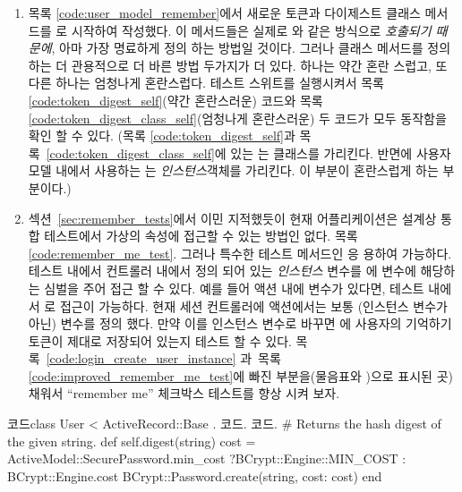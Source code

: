 {{%
  

\begin{enumerate} 

\item 목록 \ref{code:user_model_remember}에서 새로운 토큰과 다이제스트 클래스 메서드를  로 시작하여 작성했다. 이 메서드들은 실제로 와  같은 방식으로 \emph{호출되기 때문에}, 아마 가장 명료하게 정의 하는 방법일 것이다. 그러나 클래스 메서드를 정의 하는 더 관용적으로 더 바른 방법 두가지가 더 있다. 하나는 약간 혼란 스럽고, 또다른 하나는 엄청나게 혼란스럽다. 테스트 스위트를 실행시켜서 목록 \ref{code:token_digest_self}(약간 혼란스러운) 코드와 목록 \ref{code:token_digest_class_self}(엄청나게 혼란스러운) 두 코드가 모두 동작함을 확인 할 수 있다. (목록 \ref{code:token_digest_self}과 목록~\ref{code:token_digest_class_self}에 있는  는  클래스를 가리킨다. 반면에 사용자 모델 내에서 사용하는 는  \emph{인스턴스}객체를 가리킨다. 이 부분이 혼란스럽게 하는 부분이다.) 

\item 섹션~\ref{sec:remember_tests}에서 이민 지적했듯이 현재 어플리케이션은 설계상 통합 테스트에서 가상의  속성에 접근할 수 있는 방법인 없다. 목록 \ref{code:remember_me_test}. 그러나 특수한 테스트 메서드인 응 용하여 가능하다. 테스트 내에서 컨트롤러 내에서 정의 되어 있는 \emph{인스턴스 } 변수를 에 변수에 해당하는 심벌을 주어 접근 할 수 있다. 예를 들어  액션 내에  변수가 있다면, 테스트 내에서 로 접근이 가능하다. 현재 세션 컨트롤러에  액션에서는 보통 (인스턴스 변수가 아닌)  변수를 정의 했다. 만약 이를 인스턴스 변수로 바꾸면 에 사용자의 기억하기 토큰이 제대로 저장되어 있는지 테스트 할 수 있다. 목록~\ref{code:login_create_user_instance} 과~목록 \ref{code:improved_remember_me_test}에 빠진 부분을(물음표와 )으로 표시된 곳) 채워서 ``remember me'' 체크박스 테스트를 향상 시켜 보자. 

\end{enumerate} 

\begin{codelisting} \label{code:token_digest_self}  

\begin{code} 코드class User < ActiveRecord::Base . 코드. 코드. # Returns the hash digest of the given string. def self.digest(string) cost = ActiveModel::SecurePassword.min_cost ?BCrypt::Engine::MIN_COST : BCrypt::Engine.cost BCrypt::Password.create(string, cost: cost) end 


\end{code}
\end{codelisting}}}
